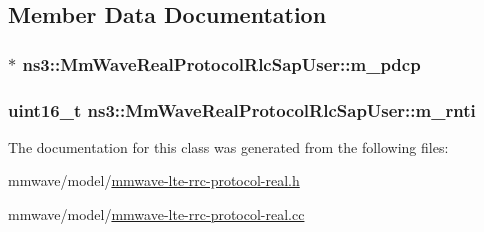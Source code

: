 \subsection{Member Data Documentation}
\subsubsection[{\texorpdfstring{m\+\_\+pdcp}{m_pdcp}}]{$\ast$ ns3\+::\+Mm\+Wave\+Real\+Protocol\+Rlc\+Sap\+User\+::m\+\_\+pdcp\hspace{0.3cm}{\ttfamily [private]}}\hypertarget{classns3_1_1MmWaveRealProtocolRlcSapUser_afdbc2946e7d699cd80681c922cb6cc44}{}\label{classns3_1_1MmWaveRealProtocolRlcSapUser_afdbc2946e7d699cd80681c922cb6cc44}
\subsubsection[{\texorpdfstring{m\+\_\+rnti}{m_rnti}}]{\setlength{\rightskip}{0pt plus 5cm}uint16\+\_\+t ns3\+::\+Mm\+Wave\+Real\+Protocol\+Rlc\+Sap\+User\+::m\+\_\+rnti\hspace{0.3cm}{\ttfamily [private]}}\hypertarget{classns3_1_1MmWaveRealProtocolRlcSapUser_ac31c0ffea28c655087d8b3281633fbc5}{}\label{classns3_1_1MmWaveRealProtocolRlcSapUser_ac31c0ffea28c655087d8b3281633fbc5}


The documentation for this class was generated from the following files\+:\begin{DoxyCompactItemize}
\item 
mmwave/model/\hyperlink{mmwave-lte-rrc-protocol-real_8h}{mmwave-\/lte-\/rrc-\/protocol-\/real.\+h}\item 
mmwave/model/\hyperlink{mmwave-lte-rrc-protocol-real_8cc}{mmwave-\/lte-\/rrc-\/protocol-\/real.\+cc}\end{DoxyCompactItemize}
